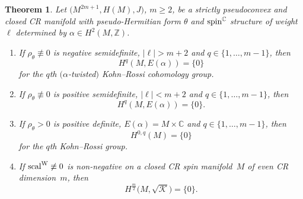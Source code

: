 \documentclass[pdftex]{sigma}
\numberwithin{equation}{section}
\newtheorem{Theorem}{Theorem}[section]
\newcommand{\ZZ}{\mathbb{Z}}
\newcommand{\CC}{\mathbb{C}}
\begin{document}
\begin{Theorem} \label{VanKR} Let $\big(M^{2m+1}, H(M),J\big)$, $m\geq 2$, be a strictly pseudoconvex and closed CR manifold
with pseudo-Hermitian form $\theta$ and ${\rm spin}^\CC$ structure of weight~$\ell$ determined by $\alpha\in H^2(M,\ZZ)$.
\begin{enumerate}\itemsep=0pt
\item[$1.$] If $\rho_\theta\not\equiv 0$ is negative semidefinite, $|\ell|>m+2$ and $q\in\{1,\dots,m-1\}$, then
\[
H^q(M,E(\alpha)) = \{0\}
\]
for the $q$th $(\alpha$-twisted$)$ Kohn--Rossi cohomology group.
\item[$2.$] If $\rho_\theta\not\equiv 0$ is positive semidefinite, $|\ell|<m+2$ and $q\in\{1,\dots,m-1\}$, then
\[
H^q(M,E(\alpha)) = \{0\}.
\]
\item[$3.$] If $\rho_\theta>0$ is positive definite, $E(\alpha)=M\times\CC$ and $q\in\{1,\dots,m-1\}$, then
\[
H^{0,q}(M) = \{0\}
\]
for the $q$th Kohn--Rossi group.
\item[$4.$] If ${\rm scal}^{\rm W}\not\equiv 0$ is non-negative on a closed CR spin manifold~$M$ of even CR dimension~$m$, then
\[
H^{\frac{m}{2}}\big(M,\sqrt{\mathcal{K}}\big) = \{0\}.
\]
\end{enumerate}
\end{Theorem}
\end{document}
